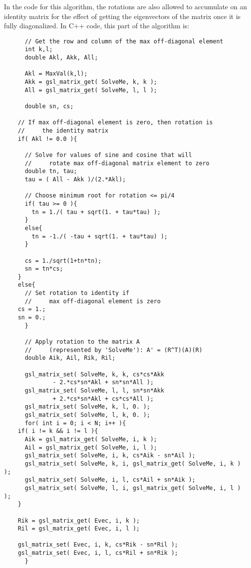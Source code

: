 \documentclass[a4paper,12pt]{report}
\begin{document}
\begin{enumerate}
In the code for this algorithm, the rotations are also allowed to accumulate on an identity matrix for the effect of getting the eigenvectors of the matrix once it is fully diagonalized. In C++ code, this part of the algorithm is:

\begin{verbatim}
      // Get the row and column of the max off-diagonal element
      int k,l;
      double Akl, Akk, All;

      Akl = MaxVal(k,l);
      Akk = gsl_matrix_get( SolveMe, k, k );
      All = gsl_matrix_get( SolveMe, l, l );

      double sn, cs;

	// If max off-diagonal element is zero, then rotation is
	//     the identity matrix
	if( Akl != 0.0 ){

	  // Solve for values of sine and cosine that will 
	  //     rotate max off-diagonal matrix element to zero
	  double tn, tau;
	  tau = ( All - Akk )/(2.*Akl);

	  // Choose minimum root for rotation <= pi/4
	  if( tau >= 0 ){
	    tn = 1./( tau + sqrt(1. + tau*tau) );
	  }
	  else{
	    tn = -1./( -tau + sqrt(1. + tau*tau) );
	  }

	  cs = 1./sqrt(1+tn*tn);
	  sn = tn*cs;
	}
	else{
	  // Set rotation to identity if
	  //     max off-diagonal element is zero
	cs = 1.;
	sn = 0.;
      }

      // Apply rotation to the matrix A 
      //     (represented by 'SolveMe'): A' = (R^T)(A)(R)
      double Aik, Ail, Rik, Ril;
    
      gsl_matrix_set( SolveMe, k, k, cs*cs*Akk 
		      - 2.*cs*sn*Akl + sn*sn*All );
      gsl_matrix_set( SolveMe, l, l, sn*sn*Akk 
		      + 2.*cs*sn*Akl + cs*cs*All );
      gsl_matrix_set( SolveMe, k, l, 0. );
      gsl_matrix_set( SolveMe, l, k, 0. );
      for( int i = 0; i < N; i++ ){
	if( i != k && i != l ){
	  Aik = gsl_matrix_get( SolveMe, i, k );
	  Ail = gsl_matrix_get( SolveMe, i, l );
	  gsl_matrix_set( SolveMe, i, k, cs*Aik - sn*Ail );
	  gsl_matrix_set( SolveMe, k, i, gsl_matrix_get( SolveMe, i, k ) );
	  gsl_matrix_set( SolveMe, i, l, cs*Ail + sn*Aik );
	  gsl_matrix_set( SolveMe, l, i, gsl_matrix_get( SolveMe, i, l ) );
	}
      
	Rik = gsl_matrix_get( Evec, i, k );
	Ril = gsl_matrix_get( Evec, i, l );

	gsl_matrix_set( Evec, i, k, cs*Rik - sn*Ril );
	gsl_matrix_set( Evec, i, l, cs*Ril + sn*Rik );
      }

\end{verbatim}


\end{enumerate}
\end{document}
